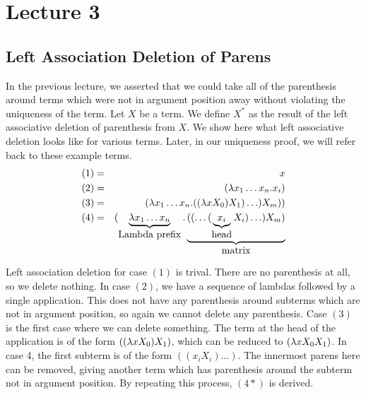 \chapter{Lecture 3}

\section{Left Association Deletion of Parens}
In the previous lecture, we asserted that we could take all of the parenthesis around terms which were not in argument position away without violating the uniqueness of the term. Let $X$ be a term. We define $X^*$ as the result of the left associative deletion of parenthesis from $X$. We show here what left associative deletion looks like for various terms. Later, in our uniqueness proof, we will refer back to these example terms.\\

\begin{eqnarray*}
  (1) &=& x\\
  (2) &=& (\lambda x_1 \ldots x_n . x_i)\\
  (3) &=& (\lambda x_1 \ldots x_n.((\lambda xX_0)X_1) \ldots )X_m))\\
  (4) &=& (\underbrace{\lambda x_1 \ldots x_n}_{\hbox{Lambda prefix}} . \underbrace{(( \ldots (\underbrace{x_i}_{\hbox{head}} X_i) \ldots )X_m )}_{\hbox{matrix}}\\
\end{eqnarray*}


Left association deletion for case $(1)$ is trival. There are no parenthesis at all, so we delete nothing. In case $(2)$, we have a sequence of lambdas followed by a single application. This does not have any parenthesis around subterms which are not in argument position, so again we cannot delete any parenthesis. Case $(3)$ is the first case where we can delete something. The term at the head of the application is of the form $((\lambda xX_0)X_1)$, which can be reduced to $(\lambda xX_0X_1)$. In case 4, the first subterm is of the form $((x_i X_i)\ldots)$. The innermost parens here can be removed, giving another term which has parenthesis around the subterm not in argument position. By repeating this process, $(4*)$ is derived.

